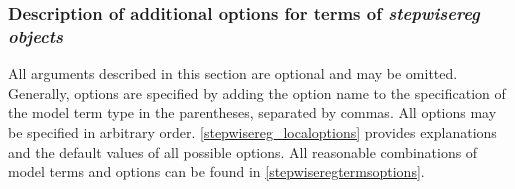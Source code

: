 \subsubsection{Description of additional options for terms of {\em stepwisereg objects}}
\label{stepwisereglocaloptions}

All arguments described in this section are optional and may be
omitted. Generally, options are specified by adding the option name
to the specification of the model term type in the parentheses,
separated by commas. All options may be specified in arbitrary
order. \autoref{stepwisereg_localoptions} provides explanations and the
default values of all possible options. All reasonable combinations
of model terms and options can be found in
\autoref{stepwiseregtermsoptions}.


